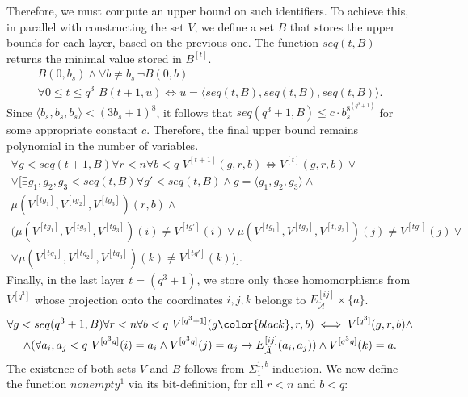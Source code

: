 \documentclass{article}
\newcommand{\bl}{\color{black}}
\theoremstyle{definition}
\theoremstyle{theorem}
\theoremstyle{theorem}
\theoremstyle{remark}
\theoremstyle{remark}
\theoremstyle{example}
\theoremstyle{notation}
\theoremstyle{theorem}
\begin{document}
Therefore, we must compute an upper bound on such identifiers. To achieve this, in parallel with constructing the set $V$, we define a set $B$ that stores the upper bounds for each layer, based on the previous one. The function $seq(t, B)$ returns the minimal value stored in $B^{[t]}$.
\begin{equation}
    \begin{gathered}
        B(0,b_s)\wedge\forall b\neq b_s\,\neg B(0,b)\\
        \forall 0\leq t\leq q^3\,\,
        B(t+1,u) \iff u =\langle seq(t,B),seq(t,B),seq(t,B)\rangle.
    \end{gathered}
\end{equation}
Since $\langle b_s, b_s, b_s \rangle < (3b_s + 1)^8$, it follows that $seq(q^3 + 1, B) \leq c \cdot b_s^{8^{(q^3 + 1)}}$ for some appropriate constant $c$. Therefore, the final upper bound remains polynomial in the number of variables.
\begin{equation}\label{aklsdjfglg}
    \begin{gathered}
\forall g<seq(t+1,B) \forall r<n\forall b<q \,\, V^{[t+1]} ( g, r,b) \iff V^{[t]} (g,r,b) \vee\\ \vee\big[\exists g_1,g_2,g_3<seq(t,B) \forall g'<seq(t,B)\wedge g=\langle g_1,g_2,g_3\rangle\wedge \\
\mu(V^{[tg_1]},V^{[tg_2]},V^{[tg_3]})( r,b)\wedge \\
    \big(\mu(V^{[tg_1]},V^{[tg_2]},V^{[tg_3]})(i)\neq V^{[tg']}(i)\vee\mu(V^{[tg_1]},V^{[tg_2]},V^{[t,g_3]})(j)\neq V^{[tg']}(j)\vee\\
\vee\mu(V^{[tg_1]},V^{[tg_2]},V^{[tg_3]})(k)\neq V^{[tg']}(k)\big)\big].
    \end{gathered}
\end{equation}
Finally, in the last layer $t = (q^3 + 1)$, we store only those homomorphisms from $V^{[q^3]}$ whose projection onto the coordinates $i, j, k$ belongs to $E^{[ij]}_{\ddot{\mathcal{A}}} \times \{a\}$.
\begin{equation}
    \begin{gathered}
\forall g<seq(q^3+1,B) \forall r<n\forall b<q \,\, V^{[q^3+1]} ( g\bl, r,b) \iff V^{[q^3]} (g,r,b)\wedge \\
\wedge (\forall a_i,a_j<q\,\,V^{[q^3g]}(i)=a_i\wedge V^{[q^3g]}(j) =a_j\rightarrow E^{[ij]}_{\ddot{\mathcal{A}}}(a_i,a_j))\wedge V^{[q^3g]}(k)=a.
    \end{gathered}
\end{equation}
The existence of both sets $V$ and $B$ follows from $\Sigma^{1,b}_1$-induction. We now define the function $nonempty^1$ via its bit-definition, for all $r < n$ and $b < q$:
\end{document}
